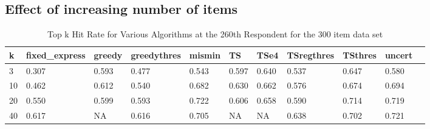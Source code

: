 \documentclass[nonblindrev]{informs3}
\begin{document}
\subsection{Effect of increasing number of items}
\begin{table}
\begin{center}
\begin{tabular}{lllllllllll}
\hline   k &  fixed\_express &  greedy &  greedythres &  mismin &    TS &  TSe4 & TSregthres & TSthres &  uncert \\ \hline 3&   0.307 &   0.593 &        0.477 &   0.543 &  0.597 & 0.640 & 0.537 &       0.647 &   0.580 \\ 10 &          0.462 &   0.612 &        0.540 &   0.682  & 0.630 & 0.662   & 0.576 &       0.674  &   0.694 \\ 20 & 0.550 &   0.599 &        0.593 &   0.722 &   0.606 & 0.658 &      0.590 &       0.714 &   0.719\\ 40 & 0.617 &   NA &        0.616 &   0.705 &    NA & NA &    0.638 &       0.702 &    0.721 \end{tabular}
\end{center}
\caption{Top k Hit Rate for Various Algorithms at the 260th Respondent for the 300 item data set}
\label{table:300at260}
\end{table}
\end{document}
